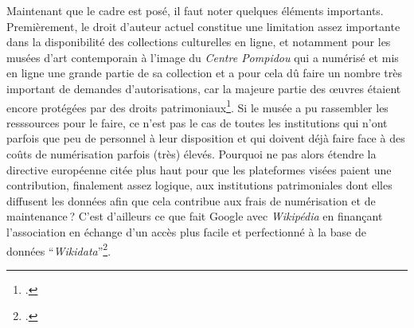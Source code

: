 Maintenant que le cadre est posé, il faut noter quelques éléments importants. Premièrement, le droit d’auteur actuel constitue une limitation assez importante dans la disponibilité des collections culturelles en ligne, et notamment pour les musées d’art contemporain à l’image du \textit{Centre Pompidou} qui a numérisé et mis en ligne une grande partie de sa collection et a pour cela dû faire un nombre très important de demandes d’autorisations, car la majeure partie des œuvres étaient encore protégées par des droits patrimoniaux\footcite[§ 10]{bermes_parcours_2013}. Si le musée a pu rassembler les resssources pour le faire, ce n’est pas le cas de toutes les institutions qui n’ont parfois que peu de personnel à leur disposition et qui doivent déjà faire face à des coûts de numérisation parfois (très) élevés. Pourquoi ne pas alors étendre la directive européenne citée plus haut pour que les plateformes visées paient une contribution, finalement assez logique, aux institutions patrimoniales dont elles diffusent les données afin que cela contribue aux frais de numérisation et de maintenance ? C’est d’ailleurs ce que fait Google avec \textit{Wikipédia} en finançant l’association en échange d’un accès plus facile et perfectionné à la base de données \enquote{\textit{Wikidata}}\footcite{noauthor_google_nodate}. 

